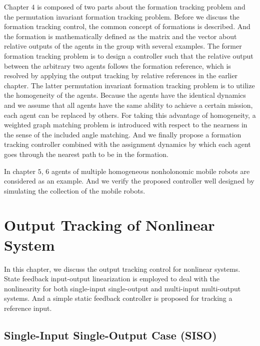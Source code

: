 \documentclass[11pt, a4paper, oneside, openany, reqno]{book}
\theoremstyle{definition}
\theoremstyle{remark}
\numberwithin{equation}{chapter} %
\begin{document}
Chapter $ 4 $ is composed of two parts about the formation tracking problem and
the permutation invariant formation tracking problem.
Before we discuss the formation tracking control, the common concept of formations is described. 
And the formation is mathematically defined as the matrix and the vector 
about relative outputs of the agents in the group with several examples.
The former formation tracking problem is to design a controller such that 
the relative output between the arbitrary two agents follows the formation reference,
which is resolved by applying the output tracking by relative references in the earlier chapter.
The latter permutation invariant formation tracking problem is to utilize the homogeneity of the agents.
Because the agents have the identical dynamics and we assume that all agents have the same ability 
to achieve a certain mission, each agent can be replaced by others.
For taking this advantage of homogeneity, a weighted graph matching problem is introduced 
with respect to the nearness in the sense of the included angle matching.
And we finally propose a formation tracking controller combined with the assignment dynamics
by which each agent goes through the nearest path to be in the formation.

In chapter $ 5 $, $ 6 $ agents of multiple homogeneous nonholonomic mobile robots are considered as an example.
And we verify the proposed controller well designed by simulating the collection of the mobile robots.

\chapter{Output Tracking of Nonlinear System}

In this chapter, we discuss the output tracking control for nonlinear systems.
State feedback input-output linearization is employed to deal with the nonlinearity 
for both single-input single-output and multi-input multi-output systems. 
And a simple static feedback controller is proposed for tracking a reference input.

\section{Single-Input Single-Output Case (SISO)}
\end{document}
